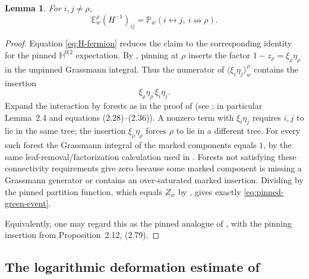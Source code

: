 \documentclass[11pt]{article}
\newtheorem{lemma}[theorem]{Lemma}
\theoremstyle{definition}
\theoremstyle{remark}
\newcommand{\PP}{\mathbb P}
\newcommand{\EE}{\mathbb E}
\newcommand{\HH}{\mathbb H}
\newcommand{\1}{\mathbf 1}
\begin{document}
\begin{lemma}\label{lem:pinned-green-event}
For $i,j\neq\rho$,
\begin{equation}\label{eq:pinned-green-event}
 \EE_w^\rho(H^{-1})_{ij}
 =\PP_w(i\leftrightarrow j,\ i\nleftrightarrow\rho).
\end{equation}
\end{lemma}

\begin{proof}
Equation \eqref{eq:H-fermion} reduces the claim to the corresponding identity for the
pinned $\HH^{0|2}$ expectation.  By \cite[Proposition~2.12, (2.79)]{BCHS}, pinning
at $\rho$ inserts the factor $1-z_\rho=\xi_\rho\eta_\rho$ in the unpinned
Grassmann integral.  Thus the numerator of
$\langle\xi_i\eta_j\rangle_w^\rho$ contains the insertion
\begin{equation}
 \xi_\rho\eta_\rho\,\xi_i\eta_j.
\end{equation}
Expand the interaction by forests as in the proof of \cite[Theorem~2.1]{BCHS} (see
\cite[Section~2.3]{BCHS}; in particular Lemma~2.4 and equations (2.28)--(2.36)).  A nonzero term
with $\xi_i\eta_j$ requires $i,j$ to lie in the same tree; the insertion
$\xi_\rho\eta_\rho$ forces $\rho$ to lie in a different tree.  For every such
forest the Grassmann integral of the marked components equals $1$, by the same
leaf-removal/factorization calculation used in \cite[Lemma~2.4]{BCHS}.  Forests not satisfying
these connectivity requirements give zero because some marked component is missing a
Grassmann generator or contains an over-saturated marked insertion.  Dividing by the
pinned partition function, which equals $Z_w$ by \cite[Proposition~2.12]{BCHS}, gives exactly
\eqref{eq:pinned-green-event}.

Equivalently, one may regard this as the pinned analogue of \cite[Corollary~2.2, (2.11)]{BCHS}, with the pinning insertion from Proposition~2.12, (2.79).
\end{proof}

\subsection{The logarithmic deformation estimate of \texorpdfstring{\cite{BCHS}}{BCHS}}
\end{document}
